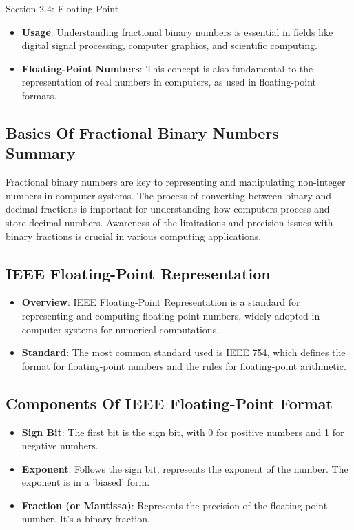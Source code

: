 \begin{notes}{Section 2.4: Floating Point}
    \begin{itemize}
        \item \textbf{Usage}: Understanding fractional binary numbers is essential in fields like digital signal processing, computer graphics, and scientific computing.
        \item \textbf{Floating-Point Numbers}: This concept is also fundamental to the representation of real numbers in computers, as used in floating-point formats.
    \end{itemize}

    \subsection*{Basics Of Fractional Binary Numbers Summary}

    Fractional binary numbers are key to representing and manipulating non-integer numbers in computer systems. The process of converting between binary and decimal fractions is important for understanding 
    how computers process and store decimal numbers. Awareness of the limitations and precision issues with binary fractions is crucial in various computing applications. \vspace*{1em}

    \subsection*{IEEE Floating-Point Representation}

    \begin{itemize}
        \item \textbf{Overview}: IEEE Floating-Point Representation is a standard for representing and computing floating-point numbers, widely adopted in computer systems for numerical computations.
        \item \textbf{Standard}: The most common standard used is IEEE 754, which defines the format for floating-point numbers and the rules for floating-point arithmetic.
    \end{itemize}
    
    \subsection*{Components Of IEEE Floating-Point Format}
    
    \begin{itemize}
        \item \textbf{Sign Bit}: The first bit is the sign bit, with 0 for positive numbers and 1 for negative numbers.
        \item \textbf{Exponent}: Follows the sign bit, represents the exponent of the number. The exponent is in a 'biased' form.
        \item \textbf{Fraction (or Mantissa)}: Represents the precision of the floating-point number. It's a binary fraction.
    \end{itemize}
    

\end{notes}
